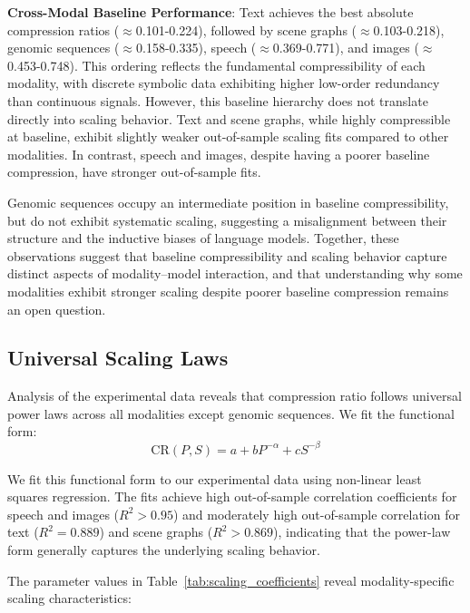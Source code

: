\documentclass[10pt]{article} %
\begin{document}
\textbf{Cross-Modal Baseline Performance}: Text achieves the best absolute compression ratios ($\approx$0.101-0.224), followed by scene graphs ($\approx$0.103-0.218), genomic sequences ($\approx$0.158-0.335), speech ($\approx$0.369-0.771), and images ($\approx$0.453-0.748). This ordering reflects the fundamental compressibility of each modality, with discrete symbolic data exhibiting higher low-order redundancy than continuous signals. However, this baseline hierarchy does not translate directly into scaling behavior. Text and scene graphs, while highly compressible at baseline, exhibit slightly weaker out-of-sample scaling fits compared to other modalities. In contrast, speech and images, despite having a poorer baseline compression, have stronger out-of-sample fits.

Genomic sequences occupy an intermediate position in baseline compressibility, but do not exhibit systematic scaling, suggesting a misalignment between their structure and the inductive biases of language models. Together, these observations suggest that baseline compressibility and scaling behavior capture distinct aspects of modality–model interaction, and that understanding why some modalities exhibit stronger scaling despite poorer baseline compression remains an open question.

\subsection{Universal Scaling Laws}

Analysis of the experimental data reveals that compression ratio follows universal power laws across all modalities except genomic sequences. We fit the functional form:
\[
\mathrm{CR}(P,S) = a + b P^{-\alpha} + c S^{-\beta}
\]

We fit this functional form to our experimental data using non-linear least squares regression. The fits achieve high out-of-sample correlation coefficients for speech and images ($R^2 > 0.95$) and moderately high out-of-sample correlation for text ($R^2 = 0.889$) and scene graphs ($R^2 > 0.869$), indicating that the power-law form generally captures the underlying scaling behavior.

The parameter values in Table~\ref{tab:scaling_coefficients} reveal modality-specific scaling characteristics:
\end{document}

